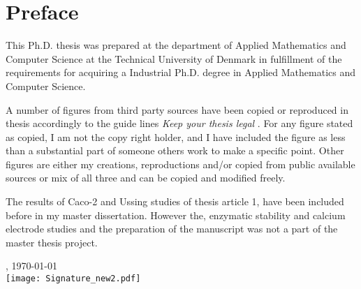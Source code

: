 \chapter{Preface}
This Ph.D. thesis was prepared at the department of Applied Mathematics and Computer Science at the Technical University of Denmark in fulfillment of the requirements for acquiring a Industrial Ph.D. degree in Applied Mathematics and Computer Science.

A number of figures from third party sources have been copied or reproduced in thesis accordingly to the guide lines \textit{Keep your thesis legal} \cite{johnson2015keeping}. For any figure stated as copied, I am not the copy right holder, and I have included the figure as less than a substantial part of someone others work to make a specific point. Other figures are either my creations, reproductions and/or copied from public available sources or mix of all three and can be copied and modified freely.

The results of Caco-2 and Ussing studies of thesis article 1, have been included before in my master dissertation. However the, enzymatic stability and calcium electrode studies and the preparation of the manuscript was not a part of the master thesis project.

\vfill

{
\centering
    \thesislocation{}, \today\\[1cm]
    \hspace{3cm}\texttt{[image: Signature\_new2.pdf]}\\[1cm]
\begin{flushright}
    \thesisauthor{}
\end{flushright}
}
